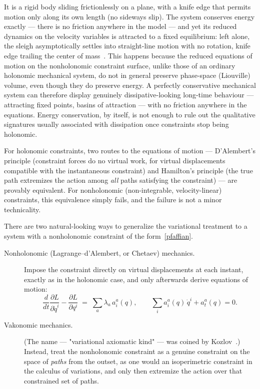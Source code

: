It is a rigid body sliding frictionlessly on a
plane, with a knife edge that permits motion only along its own
length (no sideways slip). The system conserves energy exactly ---
there is no friction anywhere in the model --- and yet its reduced
dynamics on the velocity variables is attracted to a fixed
equilibrium: left alone, the sleigh asymptotically settles into
straight-line motion with no rotation, knife edge trailing the
center of mass~\cite{chaplygin}. This
happens because the reduced equations of motion on the nonholonomic
constraint surface, unlike those of an ordinary holonomic mechanical
system, do not in general preserve phase-space (Liouville) volume,
even though they do preserve energy. A perfectly conservative
mechanical system can therefore display genuinely dissipative-looking
long-time behaviour --- attracting fixed points, basins of
attraction --- with no friction anywhere in the equations. Energy
conservation, by itself, is not enough to rule out the qualitative
signatures usually associated with dissipation once constraints stop
being holonomic.

For holonomic constraints, two routes to the equations of motion ---
D'Alembert's principle (constraint forces do no virtual work, for
virtual displacements compatible with the instantaneous constraint)
and Hamilton's principle (the true path extremizes the action among
\emph{all} paths satisfying the constraint) --- are provably
equivalent. For nonholonomic (non-integrable, velocity-linear)
constraints, this equivalence simply fails, and the failure is not a
minor technicality.

There are two natural-looking ways to generalize the variational
treatment to a system with a nonholonomic constraint of the
form~\eqref{pfaffian}.

\begin{description}
  \item[Nonholonomic (Lagrange--d'Alembert, or Chetaev) mechanics.]
  Impose the constraint directly on virtual displacements at each
  instant, exactly as in the holonomic case, and only afterwards
  derive equations of motion:
  \begin{equation}
    \frac{d}{dt}\frac{\partial L}{\partial \dot q^i}
    - \frac{\partial L}{\partial q^i}
    \;=\; \sum_a \lambda_a\, a_i^a(q),
    \qquad
    \sum_i a_i^a(q)\,\dot q^i + a_t^a(q) = 0 .
    \label{lagrange-dalembert}
  \end{equation}
  \item[Vakonomic mechanics.] (The name --- "variational axiomatic
  kind" --- was coined by Kozlov~\cite{kozlov}.)
  Instead, treat the nonholonomic constraint as a genuine constraint
  on the space of \emph{paths} from the outset, as one would an
  isoperimetric constraint in the calculus of variations, and only
  then extremize the action over that constrained set of paths.
\end{description}

